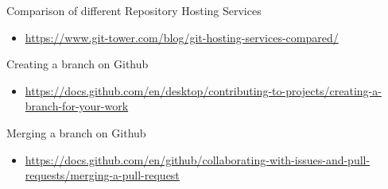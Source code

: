 \documentclass[
]{article}
\providecommand{\tightlist}{%
  \setlength{\itemsep}{0pt}\setlength{\parskip}{0pt}}
\begin{document}
Comparison of different Repository Hosting Services

\begin{itemize}
\tightlist
\item
  \url{https://www.git-tower.com/blog/git-hosting-services-compared/}
\end{itemize}

Creating a branch on Github

\begin{itemize}
\tightlist
\item
  \url{https://docs.github.com/en/desktop/contributing-to-projects/creating-a-branch-for-your-work}
\end{itemize}

Merging a branch on Github

\begin{itemize}
\tightlist
\item
  \url{https://docs.github.com/en/github/collaborating-with-issues-and-pull-requests/merging-a-pull-request}
\end{itemize}
\end{document}

